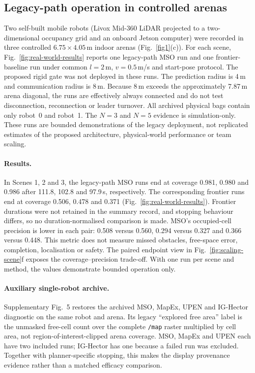 \documentclass[11pt]{article}
\begin{document}
\subsection{Legacy-path operation in controlled arenas} \label{sec:real-world-deployment}

Two self-built mobile robots (Livox Mid-360 LiDAR projected to a two-dimensional occupancy grid and an onboard Jetson computer) were recorded in three controlled $6.75{\times}4.05$\,m indoor arenas (Fig.~\ref{fig1}(c)). For each scene, Fig.~\ref{fig:real-world-results} reports one legacy-path MSO run and one frontier-baseline run under common $l{=}2$\,m, $v{=}0.5$\,m/s and start-pose protocol. The proposed rigid gate was not deployed in these runs. The prediction radius is 4\,m and communication radius is 8\,m. Because 8\,m exceeds the approximately 7.87\,m arena diagonal, the runs are effectively always connected and do not test disconnection, reconnection or leader turnover. All archived physical bags contain only robot~0 and robot~1. The $N{=}3$ and $N{=}5$ evidence is simulation-only. These runs are bounded demonstrations of the legacy deployment, not replicated estimates of the proposed architecture, physical-world performance or team scaling.

\paragraph{Results.} In Scenes 1, 2 and 3, the legacy-path MSO runs end at coverage 0.981, 0.980 and 0.986 after 111.8, 102.8 and 97.9\,s, respectively. The corresponding frontier runs end at coverage 0.506, 0.478 and 0.371 (Fig.~\ref{fig:real-world-results}). Frontier durations were not retained in the summary record, and stopping behaviour differs, so no duration-normalised comparison is made. MSO's occupied-cell precision is lower in each pair: 0.508 versus 0.560, 0.294 versus 0.327 and 0.366 versus 0.448. This metric does not measure missed obstacles, free-space error, completion, localisation or safety. The paired endpoint view in Fig.~\ref{fig:scaling-scene}f exposes the coverage--precision trade-off. With one run per scene and method, the values demonstrate bounded operation only.

\paragraph{Auxiliary single-robot archive.} Supplementary Fig.~5 restores the archived MSO, MapEx, UPEN and IG-Hector diagnostic on the same robot and arena. Its legacy ``explored free area'' label is the unmasked free-cell count over the complete \texttt{/map} raster multiplied by cell area, not region-of-interest-clipped arena coverage. MSO, MapEx and UPEN each have two included runs; IG-Hector has one because a failed run was excluded. Together with planner-specific stopping, this makes the display provenance evidence rather than a matched efficacy comparison.
\end{document}
